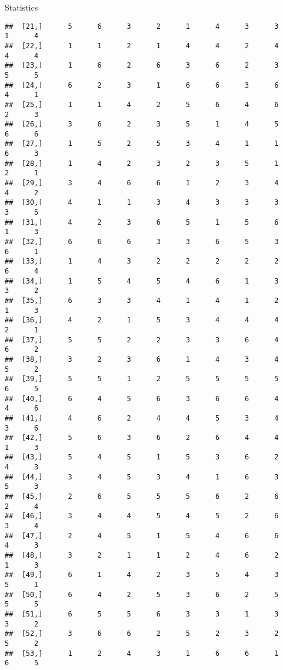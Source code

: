 \documentclass[
  ignorenonframetext,
]{beamer}
\begin{document}
\begin{frame}[fragile]{Statistics}
\begin{verbatim}
##  [21,]      5      6      3      2      1      4      3      3      1      4
##  [22,]      1      1      2      1      4      4      2      4      4      4
##  [23,]      1      6      2      6      3      6      2      3      5      5
##  [24,]      6      2      3      1      6      6      3      6      4      1
##  [25,]      1      1      4      2      5      6      4      6      2      3
##  [26,]      3      6      2      3      5      1      4      5      6      6
##  [27,]      1      5      2      5      3      4      1      1      6      3
##  [28,]      1      4      2      3      2      3      5      1      2      1
##  [29,]      3      4      6      6      1      2      3      4      4      2
##  [30,]      4      1      1      3      4      3      3      3      3      5
##  [31,]      4      2      3      6      5      1      5      6      1      3
##  [32,]      6      6      6      3      3      6      5      3      6      1
##  [33,]      1      4      3      2      2      2      2      2      6      4
##  [34,]      1      5      4      5      4      6      1      3      3      2
##  [35,]      6      3      3      4      1      4      1      2      1      3
##  [36,]      4      2      1      5      3      4      4      4      2      1
##  [37,]      5      5      2      2      3      3      6      4      6      2
##  [38,]      3      2      3      6      1      4      3      4      5      2
##  [39,]      5      5      1      2      5      5      5      5      6      5
##  [40,]      6      4      5      6      3      6      6      4      4      6
##  [41,]      4      6      2      4      4      5      3      4      3      6
##  [42,]      5      6      3      6      2      6      4      4      1      3
##  [43,]      5      4      5      1      5      3      6      2      4      3
##  [44,]      3      4      5      3      4      1      6      3      5      3
##  [45,]      2      6      5      5      5      6      2      6      2      4
##  [46,]      3      4      4      5      4      5      2      6      3      4
##  [47,]      2      4      5      1      5      4      6      6      4      3
##  [48,]      3      2      1      1      2      4      6      2      1      3
##  [49,]      6      1      4      2      3      5      4      3      5      1
##  [50,]      6      4      2      5      3      6      2      5      5      5
##  [51,]      6      5      5      6      3      3      1      3      3      2
##  [52,]      3      6      6      2      5      2      3      2      5      2
##  [53,]      1      2      4      3      1      6      6      1      6      5

\end{verbatim}
\end{frame}
\end{document}
